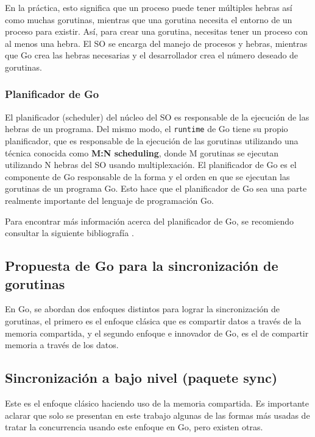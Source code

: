 \documentclass[10pt]{article} %
\begin{document}
En la práctica, esto significa que un proceso puede tener múltiples hebras así como muchas gorutinas, mientras que una gorutina necesita el entorno de un proceso para existir. Así, para crear una gorutina, necesitas tener un proceso con al menos una hebra. El SO se encarga del manejo de procesos y hebras, mientras que Go crea las hebras necesarias y el desarrollador crea el número deseado de gorutinas.

\subsubsection{Planificador de Go}

El planificador (scheduler) del núcleo del SO es responsable de la ejecución de las hebras de un programa. Del mismo modo, el \texttt{runtime} de Go tiene su propio planificador, que es responsable de la ejecución de las gorutinas utilizando una técnica conocida como \textbf{M:N scheduling}, donde M gorutinas se ejecutan utilizando N hebras del SO usando multiplexación. El planificador de Go es el componente de Go responsable de la forma y el orden en que se ejecutan las gorutinas de un programa Go. Esto hace que el planificador de Go sea una parte realmente importante del lenguaje de programación Go. 

Para encontrar más información acerca del planificador de Go, se recomiendo consultar la siguiente bibliografía \cite{scheduler}.

\subsection{Propuesta de Go para la sincronización de gorutinas}

En Go, se abordan dos enfoques distintos para lograr la sincronización de gorutinas, el primero es el enfoque clásica que es compartir datos a través de la memoria compartida, y el segundo enfoque e innovador de Go, es el de compartir memoria a través de los datos.

\subsection{ Sincronización a bajo nivel (paquete sync) }

Este es el enfoque clásico haciendo uso de la memoria compartida. Es importante aclarar que solo se presentan en este trabajo algunas de las formas más usadas de tratar la concurrencia usando este enfoque en Go, pero existen otras.
\end{document}
